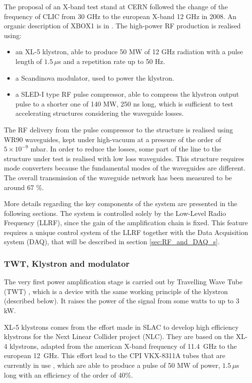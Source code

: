The proposal of an X-band test stand at CERN followed the change of the frequency of CLIC from 30 GHz to the european X-band 12 GHz in 2008. An organic description of XBOX1 is in \cite{Woolley:2015,Kovermann:1459879}. The high-power RF production is realised using:
\begin{itemize}
\item an XL-5 klystron, able to produce 50 MW of 12 GHz radiation with a pulse length of $1.5\, \mu$s and a repetition rate up to 50 Hz.
\item a Scandinova modulator, used to power the klystron.
\item a SLED-I type RF pulse compressor, able to compress the klystron output pulse to a shorter one of 140 MW, 250 ns long, which is sufficient to test accelerating structures considering the waveguide losses.
\end{itemize}

The RF delivery from the pulse compressor to the structure is realised using WR90 waveguides, kept under high-vacuum at a pressure of the order of\\ $5\times10^{-9}$ mbar. In order to reduce the losses, some part of the line to the structure under test is realised with low loss waveguides. This structure requires mode converters because the fundamental modes of the waveguides are different. The overall transmission of the waveguide network has been measured to be around 67 \%.

More details regarding the key components of the system are presented in the following sections. The system is controlled solely by the Low-Level Radio Frequency (LLRF), since the gain of the amplification chain is fixed. This feature requires a unique control system of the LLRF together with the Data Acquisition system (DAQ), that will be described in section \ref{sec:RF_and_DAQ_s}.


\subsubsection{TWT, Klystron and modulator}

The very first power amplification stage is carried out by Travelling Wave Tube (TWT) \cite{appSys:twt}, which is a device with the same working principle of the klystron (described below). It raises the power of the signal from some watts to up to 3 kW.

XL-5 klystrons comes from the effort made in SLAC to develop high efficiency klystrons for the Next Linear Collider project (NLC). They are based on the XL-4 klystrons, adapted from the american X-band frequency of 11.4~GHz to the european 12~GHz. This effort lead to the CPI VKX-8311A tubes that are currently in use \cite{klystron:CPI}, which are able to produce a pulse of 50 MW of power, $1.5 \, \mu$s long with an efficiency of the order of 40\%.
 
